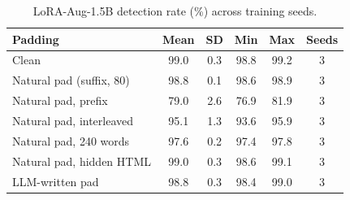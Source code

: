 \begin{table}[t]
\centering
\caption{LoRA-Aug-1.5B detection rate (\%) across training seeds.}
\label{tab:augseeds}
\footnotesize
\begin{tabular}{lccccc}
\toprule
\textbf{Padding} & \textbf{Mean} & \textbf{SD} & \textbf{Min} & \textbf{Max} & \textbf{Seeds} \\
\midrule
Clean & 99.0 & 0.3 & 98.8 & 99.2 & 3 \\
Natural pad (suffix, 80) & 98.8 & 0.1 & 98.6 & 98.9 & 3 \\
Natural pad, prefix & 79.0 & 2.6 & 76.9 & 81.9 & 3 \\
Natural pad, interleaved & 95.1 & 1.3 & 93.6 & 95.9 & 3 \\
Natural pad, 240 words & 97.6 & 0.2 & 97.4 & 97.8 & 3 \\
Natural pad, hidden HTML & 99.0 & 0.3 & 98.6 & 99.1 & 3 \\
LLM-written pad & 98.8 & 0.3 & 98.4 & 99.0 & 3 \\
\bottomrule
\end{tabular}
\end{table}